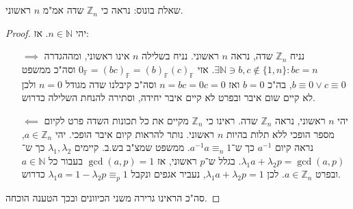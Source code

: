 \documentclass[]{article}
\newcommand\N     {\mathbb{N}}
\newcommand\Z     {\mathbb{Z}}
\newcommand\F         {\mathbb{F}}
\newcommand\co        {\colon}
\renewcommand\lg      {\lambda}
\newcommand\op    {^{-1}}
\theoremstyle{definition}
\begin{document}
	\section{}
	שאלת בונוס: נראה כי $\Z_n$ שדה אמ"מ $n$ ראשוני. 
	\begin{proof}
		יהי $n \in \N$. אז: 
		\begin{itemize}
			\item[$\implies$] נניח $\Z_n$ שדה, נראה $n$ ראשוני. נניח בשלילה $n$ אינו ראשוני, ומההגדרה $\exists \N \ni b, c \notin \{1, n\} \co bc = n$. אזי $0_\F = (bc)_\F = (b)_\F (c)_\F$ וסה"כ ממשפט $b \equiv 0 \lor c \equiv 0$, בה"כ $b = 0$ ואז $n = bc = 0c = 0$ וסה"כ קיבלנו שדה מגודל $n = 0$ ולכן לא קיים שום איבר ובפרט לא קיים איבר יחידה, וסתירה להנחת השלילה כדרוש. 
			\item[$\impliedby$]יהי $n$ ראשוני, נראה $\Z_n$ שדה. ראינו כי $\Z_n$ מקיים את כל תכונות השדה פרט לקיום מספר הופכי ללא תלות בהיות $n$ ראשוני. נותר להראות קיום איבר הופכי. יהי $a \in \Z_n$, נראה קיום $a\op$ כך ש־$a\op a \equiv_n 1$. ממשפט שמצ"ב בש.ב. קיימים $\lg_1, \lg_2$ כך ש־$\lg_1 a + \lg_2 p = \gcd(a, p)$. בגלל ש־$p$ ראשוני, אז $\gcd(a, p) = 1$ בעבור כל $a \in \N$ ובפרט $a \in \Z_n$. לכן $\lg_1 a + \lg_2 p = 1$, נעביר אגפים ונקבל $\lg_1 a = 1 - \lg_2p \equiv_p 1$ כדרוש. 
		\end{itemize}
		סה"כ הראינו גרירה משני הכיוונים ובכך הטענה הוכחה. 
	\end{proof}
	
\end{document}
